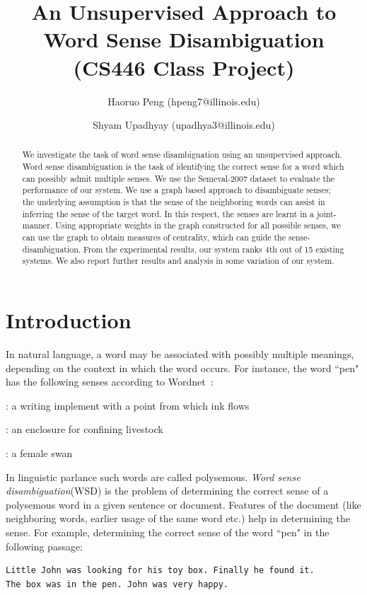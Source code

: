 \documentclass[12pt,letterpaper]{article}
\begin{document}
\title{An Unsupervised Approach to Word Sense Disambiguation \\ \Large{(CS446 Class Project)}}
\author{Haoruo Peng (hpeng7@illinois.edu) \and Shyam Upadhyay (upadhya3@illinois.edu)}
\maketitle
\begin{abstract}
We investigate the task of word sense disambiguation using an unsupervised approach. Word sense disambiguation is the task of identifying the correct sense for a word which can possibly admit multiple senses. We use the Semeval-2007 dataset to evaluate the performance of our system. We use a graph based approach to disambiguate senses; the underlying assumption is that the sense of the neighboring words can assist in inferring the sense of the target word. In this respect, the senses are learnt in a joint-manner. Using appropriate weights in the graph constructed for all possible senses, we can use the graph to obtain measures of centrality, which can guide the sense-disambiguation. From the experimental results, our system ranks 4th out of 15 existing systems. We also report further results and analysis in some variation of our system.
\end{abstract}


\section{Introduction} 
\label{sec:introduction}
In natural language, a word may be associated with possibly multiple meanings, depending on the context in which the word occurs. For instance, the word ``pen" has the following senses according to Wordnet~\cite{wordnet}:
\begin{description}
\setlength{\itemsep}{1pt}
\setlength{\parskip}{0pt}
\setlength{\parsep}{0pt}
\item [pen] : a writing implement with a point from which ink flows
\item [pen] : an enclosure for confining livestock
\item [pen] : a female swan
\end{description}

In linguistic parlance such words are called polysemous. \emph{Word sense disambiguation}(WSD) is the problem of determining the correct sense of a polysemous word in a given sentence or document. Features of the document (like neighboring words, earlier usage of the same word etc.) help in determining the sense. For example, determining the correct sense of the word ``pen" in the following passage:
\begin{verbatim}
Little John was looking for his toy box. Finally he found it. 
The box was in the pen. John was very happy.
\end{verbatim}
\end{document}
